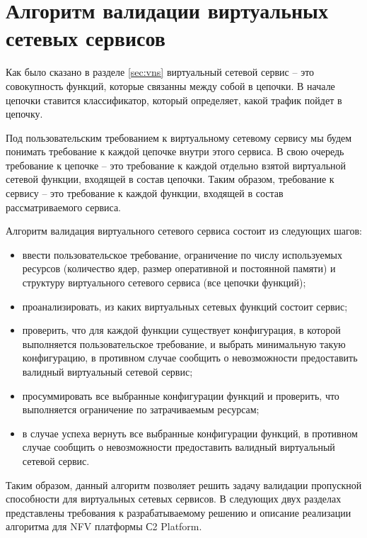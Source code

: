 \documentclass[oneside,final,14pt,a4paper]{extreport}
\begin{document}
\section{Алгоритм валидации виртуальных сетевых сервисов}
Как было сказано в разделе \ref{sec:vns} виртуальный сетевой сервис -- это совокупность функций, которые связанны между собой в цепочки. В начале цепочки ставится классификатор, который определяет, какой трафик пойдет в цепочку. 

Под пользовательским требованием к виртуальному сетевому сервису мы будем понимать требование к каждой цепочке внутри этого сервиса. В свою очередь требование к цепочке -- это требование к каждой отдельно взятой виртуальной сетевой функции, входящей в состав цепочки. Таким образом, требование к сервису -- это требование к каждой функции, входящей в состав рассматриваемого сервиса.

Алгоритм валидация виртуального сетевого сервиса состоит из следующих шагов:
\begin{itemize}
    \item ввести пользовательское требование, ограничение по числу используемых ресурсов (количество ядер, размер оперативной и постоянной памяти) и структуру виртуального сетевого сервиса (все цепочки функций); 
    \item проанализировать, из каких виртуальных сетевых функций состоит сервис;
    \item проверить, что для каждой функции существует конфигурация, в которой выполняется пользовательское требование, и выбрать минимальную такую конфигурацию, в противном случае сообщить о невозможности предоставить валидный виртуальный сетевой сервис;
    \item просуммировать все выбранные конфигурации функций и проверить, что выполняется ограничение по затрачиваемым ресурсам;
    \item в случае успеха вернуть все выбранные конфигурации функций, в противном случае сообщить о невозможности предоставить валидный виртуальный сетевой сервис.
\end{itemize}

Таким образом, данный алгоритм позволяет решить задачу валидации пропускной способности для виртуальных сетевых сервисов. В следующих двух разделах представлены требования к разрабатываемому решению и описание реализации алгоритма для NFV платформы С2 Platform\cite{bib:c2-platform}.
\end{document}
